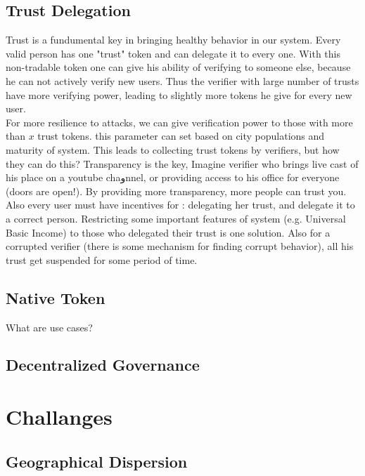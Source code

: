 \documentclass{article}
\begin{document}
\subsection{Trust Delegation}
Trust is a fundumental key in bringing healthy behavior in our system. Every valid person has one "trust" token and can delegate it to every one. With this non-tradable token one can give his ability of verifying to someone else, because he can not actively verify new users. Thus the verifier with large number of trusts have more verifying power, leading to slightly more tokens he give for every new user.
\\
For more resilience to attacks, we can give verification power to those with more than $x$ trust tokens. this parameter can set based on city populations and maturity of system. This leads to collecting trust tokens by verifiers, but how they can do this? Transparency is the key, Imagine verifier who brings live cast of his place on a youtube chaوnnel, or providing access to his office for everyone (doors are open!). By providing more transparency, more people can trust you.
\\
Also every user must have incentives for : delegating her trust, and delegate it to a correct person. Restricting some important features of system (e.g. Universal Basic Income) to those who delegated their trust is one solution. Also for a corrupted verifier (there is some mechanism for finding corrupt behavior), all his trust get suspended for some period of time.




\subsection{Native Token}
What are use cases?

\subsection{Decentralized Governance}




\section{Challanges }



\subsection{Geographical Dispersion}
\end{document}
